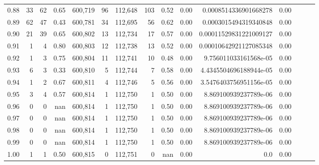 \begin{tabular}{rrrrrrrrrrrrrrr}
0.88 &      33 &      62 &  0.65 &  600,719 &       96 &  112,648 &      103 &  0.52 &  0.00 &   0.0008514336901668278 &      0.00 \\
0.89 &      62 &      47 &  0.43 &  600,781 &       34 &  112,695 &       56 &  0.62 &  0.00 &   0.0003015494319340848 &      0.00 \\
0.90 &      21 &      39 &  0.65 &  600,802 &       13 &  112,734 &       17 &  0.57 &  0.00 &  0.00011529831221009127 &      0.00 \\
0.91 &       1 &       4 &  0.80 &  600,803 &       12 &  112,738 &       13 &  0.52 &  0.00 &  0.00010642921127085348 &      0.00 \\
0.92 &       1 &       3 &  0.75 &  600,804 &       11 &  112,741 &       10 &  0.48 &  0.00 &   9.756011033161568e-05 &      0.00 \\
0.93 &       6 &       3 &  0.33 &  600,810 &        5 &  112,744 &        7 &  0.58 &  0.00 &  4.4345504696188944e-05 &      0.00 \\
0.94 &       1 &       2 &  0.67 &  600,811 &        4 &  112,746 &        5 &  0.56 &  0.00 &  3.5476403756951156e-05 &      0.00 \\
0.95 &       3 &       4 &  0.57 &  600,814 &        1 &  112,750 &        1 &  0.50 &  0.00 &   8.869100939237789e-06 &      0.00 \\
0.96 &       0 &       0 &   nan &  600,814 &        1 &  112,750 &        1 &  0.50 &  0.00 &   8.869100939237789e-06 &      0.00 \\
0.97 &       0 &       0 &   nan &  600,814 &        1 &  112,750 &        1 &  0.50 &  0.00 &   8.869100939237789e-06 &      0.00 \\
0.98 &       0 &       0 &   nan &  600,814 &        1 &  112,750 &        1 &  0.50 &  0.00 &   8.869100939237789e-06 &      0.00 \\
0.99 &       0 &       0 &   nan &  600,814 &        1 &  112,750 &        1 &  0.50 &  0.00 &   8.869100939237789e-06 &      0.00 \\
1.00 &       1 &       1 &  0.50 &  600,815 &        0 &  112,751 &        0 &   nan &  0.00 &                     0.0 &      0.00 \\
\bottomrule
\end{tabular}
